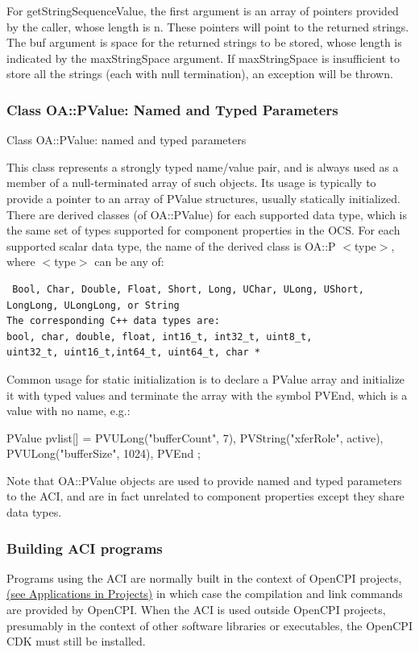 \documentclass[10pt, a4paper, oneside]{article}
\renewcommand\_{\textunderscore\allowbreak} %
\begin{document}
For getStringSequenceValue, the first argument is an array of pointers provided by the caller, whose length is n.  These pointers will point to the returned strings.  The buf argument is space for the returned strings to be stored, whose length is indicated by the maxStringSpace argument.  If maxStringSpace is insufficient to store all the strings (each with null termination), an exception will be thrown.
\subsubsection{Class OA::PValue: Named and Typed Parameters}\hypertarget{Class OA::PValue: named and typed parameters}{Class OA::PValue: named and typed parameters} This class represents a strongly typed name/value pair, and is always used as a member of a null-terminated array of such objects.  Its usage is typically to provide a pointer to an array of PValue structures, usually statically initialized.  There are derived classes (of OA::PValue) for each supported data type, which is the same set of types supported for component properties in the OCS. For each supported scalar data type, the name of the derived class is OA::P $<$type$>$, where $<$type$>$ can be any of:
\begin{verbatim} Bool, Char, Double, Float, Short, Long, UChar, ULong, UShort, LongLong, ULongLong, or String 
The corresponding C++ data types are:
bool, char, double, float, int16_t, int32_t, uint8_t, 
uint32_t, uint16_t,int64_t, uint64_t, char *\end{verbatim} 

Common usage for static initialization is to declare a PValue array and initialize it with typed values and terminate the array with the symbol PVEnd, which is a value with no name, e.g.:
\begin{ocpixml}
PValue pvlist[] = {
  PVULong("bufferCount", 7),
  PVString("xferRole", active),
  PVULong("bufferSize", 1024),
  PVEnd };
\end{ocpixml}
Note that OA::PValue objects are used to provide named and typed parameters to the ACI, and are in fact unrelated to component properties except they share data types.
\subsubsection{Building ACI programs} Programs using the ACI are normally built in the context of OpenCPI projects, \hyperlink{Applications in projects}{(see Applications in Projects)} in which case the compilation and link commands are provided by OpenCPI.  When the ACI is used outside OpenCPI projects, presumably in the context of other software libraries or executables, the OpenCPI CDK must still be installed.\\
\end{document}
